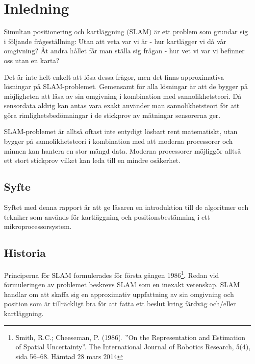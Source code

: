\documentclass[a4paper,12pt,fleqn]{article}
\begin{document}
\addto\captionsswedish{\renewcommand{\contentsname}{Innehållsförteckning}}

\tableofcontents
\thispagestyle{fancy}
\newpage


\section{Inledning}

Simultan positionering och kartläggning (SLAM) är ett problem som grundar sig i följande frågeställning: Utan att veta var vi är - hur kartlägger vi då vår omgivning? Åt andra hållet får man ställa sig frågan - hur vet vi var vi befinner oss utan en karta?

Det är inte helt enkelt att lösa dessa frågor, men det finns approximativa lösningar på SLAM-problemet. Gemensamt för alla lösningar är att de bygger på möjligheten att läsa av sin omgivning i kombination med
sannolikhetsteori. Då sensordata aldrig kan antas vara exakt använder man sannolikhetsteori för att göra rimlighetsbedömningar i de stickprov av mätningar sensorerna ger.

SLAM-problemet är alltså oftast inte entydigt lösbart rent matematiskt, utan
bygger på sannolikhetsteori i kombination med att moderna processorer
och minnen kan hantera en stor mängd data. Moderna processorer möjliggör
alltså ett stort stickprov vilket kan leda till en mindre osäkerhet.

\subsection{Syfte}
Syftet med denna rapport är att ge läsaren en introduktion till de algoritmer och tekniker som används för kartläggning och positionsbestämning i ett mikroprocessorsystem.

\subsection{Historia}

Principerna för SLAM formulerades för första gången 1986\footnote{Smith, R.C.; Cheeseman, P. (1986).
''On the Representation and Estimation of Spatial Uncertainty''. The
International Journal of Robotics Research, 5(4), sida 56–68. Hämtad 28 mars 2014}. Redan vid formuleringen av problemet beskrevs SLAM som en inexakt vetenskap. SLAM handlar om att skaffa sig en approximativ uppfattning av sin omgivning och position som är tillräckligt bra för att fatta ett beslut kring färdväg och/eller kartläggning. 
\end{document}
